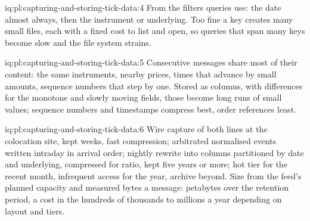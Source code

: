 \begin{solution}{iq:pl:capturing-and-storing-tick-data:4}
From the filters queries use: the date almost always, then the instrument or underlying. Too fine a key creates many small files,
each with a fixed cost to list and open, so queries that span many keys become slow and the file system strains.
\end{solution}

\begin{solution}{iq:pl:capturing-and-storing-tick-data:5}
Consecutive messages share most of their content: the same instruments, nearby prices, times that advance by small amounts,
sequence numbers that step by one. Stored as columns, with differences for the monotone and slowly moving fields, those become
long runs of small values; sequence numbers and timestamps compress best, order references least.
\end{solution}

\begin{solution}{iq:pl:capturing-and-storing-tick-data:6}
Wire capture of both lines at the colocation site, kept weeks, fast compression; arbitrated normalised events written intraday
in arrival order; nightly rewrite into columns partitioned by date and underlying, compressed for ratio, kept five years or
more; hot tier for the recent month, infrequent access for the year, archive beyond. Size from the feed's planned capacity and
measured bytes a message: petabytes over the retention period, a cost in the hundreds of thousands to millions a year depending
on layout and tiers.
\end{solution}
